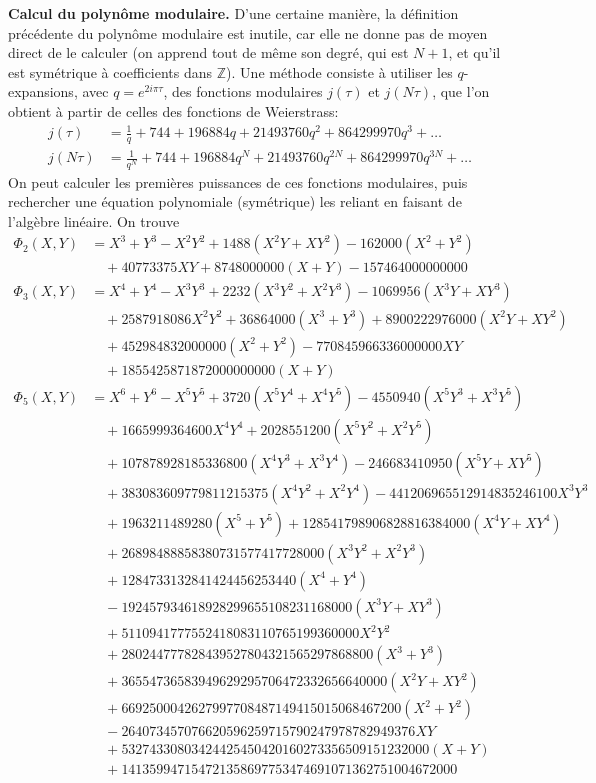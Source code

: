 \documentclass[11pt,a4paper]{article}
\newcommand{\Z}{\mathbb{Z}}
\theoremstyle{definition}
\begin{document}
\textbf{Calcul du polynôme modulaire.} D'une certaine manière, la définition précédente du polynôme modulaire est inutile, car elle ne donne pas de moyen direct de le calculer (on apprend tout de même son degré, qui est $N+1$, et qu'il est symétrique à coefficients dans $\Z$). Une méthode consiste à utiliser les $q$-expansions, avec $q = e^{2i\pi\tau}$, des fonctions modulaires $j(\tau)$ et $j(N\tau)$, que l'on obtient à partir de celles des fonctions de Weierstrass:
$$\begin{aligned}
j(\tau) &= \frac{1}{q} + 744 + 196884 q + 21493760 q^2 + 864299970 q^3 + \ldots\\
j(N\tau) &= \frac{1}{q^N} + 744 + 196884 q^N + 21493760 q^{2N} + 864299970 q^{3N} + \ldots
\end{aligned}$$
On peut calculer les premières puissances de ces fonctions modulaires, puis rechercher une équation polynomiale (symétrique) les reliant en faisant de l'algèbre linéaire. On trouve
$$\begin{aligned}
\Phi_2(X, Y) &=  X^3 + Y^3 - X^2 Y^2 + 1488(X^2Y + X Y^2)  - 162000(X^2 + Y^2) \\
&\quad + 40773375 XY  + 8748000000(X + Y) - 157464000000000\\
\Phi_3(X, Y) &= X^4 + Y^4 - X^3 Y^3 + 2232(X^3 Y^2 + X^2 Y^3) - 1069956(X^3 Y + X Y^3)\\
&\quad + 2587918086 X^2 Y^2  + 36864000(X^3 + Y^3) + 8900222976000(X^2 Y + X Y^2)  \\
&\quad + 452984832000000(X^2 + Y^2) - 770845966336000000 XY \\
&\quad + 1855425871872000000000(X + Y)\\
\Phi_5(X, Y) &= X^6 + Y^6 -X^5 Y^5 + 3720(X^5 Y^4 + X^4 Y^5) - 4550940(X^5 Y^3 + X^3 Y^5) \\
&\quad + 1665999364600 X^4 Y^4 + 2028551200(X^5 Y^2 + X^2 Y^5) \\
&\quad + 107878928185336800(X^4 Y^3 + X^3 Y^4) - 246683410950(X^5 Y + X Y^5) \\
&\quad + 383083609779811215375(X^4 Y^2 + X^2 Y^4) - 441206965512914835246100 X^3 Y^3 \\
&\quad + 1963211489280(X^5 + Y^5) + 128541798906828816384000(X^4 Y + X Y^4) \\
&\quad + 26898488858380731577417728000(X^3 Y^2 + X^2 Y^3) \\
&\quad +  1284733132841424456253440(X^4 + Y^4) \\
&\quad - 192457934618928299655108231168000(X^3 Y + X Y^3) \\
&\quad + 5110941777552418083110765199360000 X^2 Y^2 \\
&\quad + 280244777828439527804321565297868800(X^3 + Y^3) \\
&\quad + 36554736583949629295706472332656640000(X^2 Y + X Y^2) \\
&\quad + 6692500042627997708487149415015068467200( X^2 + Y^2) \\
&\quad - 264073457076620596259715790247978782949376 XY \\
&\quad + 53274330803424425450420160273356509151232000(X + Y) \\
&\quad + 141359947154721358697753474691071362751004672000
\end{aligned}$$
\end{document}
